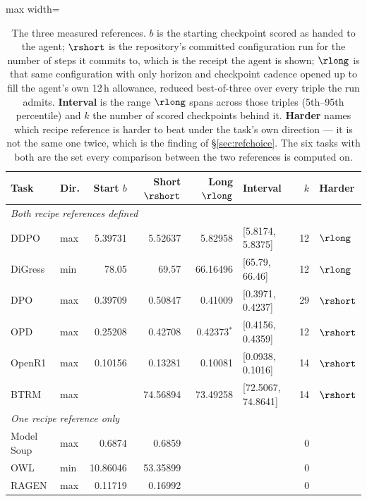 \begin{table}[t]
\centering
\caption{The three measured references. $b$ is the starting checkpoint scored as handed to the
agent; $\rshort$ is the repository's committed configuration run for the number of steps it
commits to, which is the receipt the agent is shown; $\rlong$ is that same configuration with
only horizon and checkpoint cadence opened up to fill the agent's own 12\,h allowance, reduced
best-of-three over every triple the run admits. \textbf{Interval} is the range $\rlong$ spans
across those triples (5th--95th percentile) and $k$ the number of scored checkpoints behind it.
\textbf{Harder} names which recipe reference is harder to beat under the task's own direction ---
it is not the same one twice, which is the finding of \S\ref{sec:refchoice}. The six tasks with
both are the set every comparison between the two references is computed on.}
\label{tab:baselines}
\small
\begin{adjustbox}{max width=\linewidth}
\begin{tabular}{llrrrlrl}
\toprule
\textbf{Task} & \textbf{Dir.} & \textbf{Start $b$} & \textbf{Short $\rshort$} & \textbf{Long $\rlong$} & \textbf{Interval} & \textbf{$k$} & \textbf{Harder} \\
\midrule
\multicolumn{8}{l}{\emph{Both recipe references defined}} \\
DDPO    & max & 5.39731  & 5.52637  & 5.82958  & [5.8174, 5.8375]   & 12 & $\rlong$ \\
DiGress & min & 78.05    & 69.57    & 66.16496 & [65.79, 66.46]     & 12 & $\rlong$ \\
DPO     & max & 0.39709  & 0.50847  & 0.41009  & [0.3971, 0.4237]   & 29 & $\rshort$ \\
OPD     & max & 0.25208  & 0.42708  & 0.42373$^\ast$ & [0.4156, 0.4359] & 12 & $\rshort$ \\
OpenR1  & max & 0.10156  & 0.13281  & 0.10081  & [0.0938, 0.1016]   & 14 & $\rshort$ \\
BTRM    & max & \na{}    & 74.56894 & 73.49258 & [72.5067, 74.8641] & 14 & $\rshort$ \\
\midrule
\multicolumn{8}{l}{\emph{One recipe reference only}} \\
Model Soup & max & 0.6874   & 0.6859   & \na{} & \na{} & 0 & \na{} \\
OWL        & min & 10.86046 & 53.35899 & \na{} & \na{} & 0 & \na{} \\
RAGEN      & max & 0.11719  & 0.16992  & \na{} & \na{} & 0 & \na{} \\

\end{tabular}
\end{adjustbox}
\end{table}
